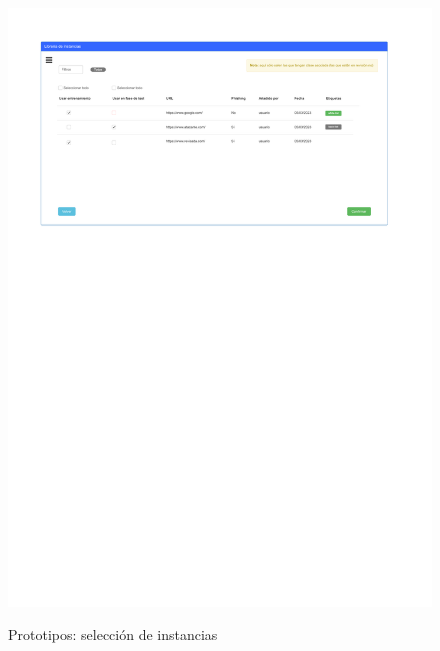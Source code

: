 \begin{figure}[h]
	\caption{Prototipos: selección de instancias}
	\centering
	\includegraphics[width=\textwidth]{../img/anexos/mockups/8-mockups-select_instances}
	\label{mock:instance-selection}
\end{figure}

